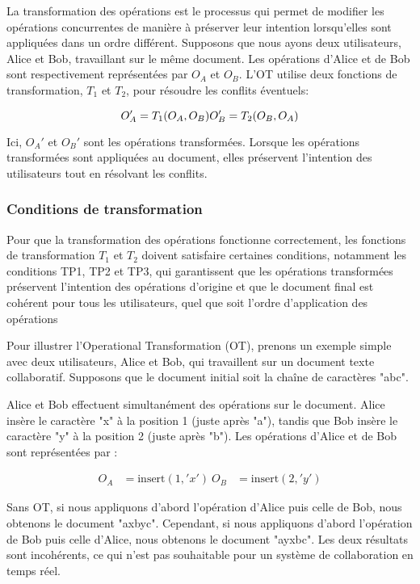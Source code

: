 La transformation des opérations est le processus qui permet de modifier les opérations concurrentes de manière à préserver leur intention lorsqu'elles sont appliquées dans un ordre différent. Supposons que nous ayons deux utilisateurs, Alice et Bob, travaillant sur le même document. Les opérations d'Alice et de Bob sont respectivement représentées par $O_A$ et $O_B$. L'OT utilise deux fonctions de transformation, $T_1$ et $T_2$, pour résoudre les conflits éventuels:

\begin{equation}
O_A' = T_1(O_A, O_B)\\
O_B' = T_2(O_B, O_A)
\end{equation}

Ici, $O_A'$ et $O_B'$ sont les opérations transformées. Lorsque les opérations transformées sont appliquées au document, elles préservent l'intention des utilisateurs tout en résolvant les conflits.

\subsubsection{Conditions de transformation}

Pour que la transformation des opérations fonctionne correctement, les fonctions de transformation $T_1$ et $T_2$ doivent satisfaire certaines conditions, notamment les conditions TP1, TP2 et TP3, qui garantissent que les opérations transformées préservent l'intention des opérations d'origine et que le document final est cohérent pour tous les utilisateurs, quel que soit l'ordre d'application des opérations

Pour illustrer l'Operational Transformation (OT), prenons un exemple simple avec deux utilisateurs, Alice et Bob, qui travaillent sur un document texte collaboratif. Supposons que le document initial soit la chaîne de caractères "abc".

Alice et Bob effectuent simultanément des opérations sur le document. Alice insère le caractère "x" à la position 1 (juste après "a"), tandis que Bob insère le caractère "y" à la position 2 (juste après "b"). Les opérations d'Alice et de Bob sont représentées par :

\begin{equation}
\begin{aligned}
O_A &= \text{insert}(1, 'x') \
O_B &= \text{insert}(2, 'y')
\end{aligned}
\end{equation}

Sans OT, si nous appliquons d'abord l'opération d'Alice puis celle de Bob, nous obtenons le document "axbyc". Cependant, si nous appliquons d'abord l'opération de Bob puis celle d'Alice, nous obtenons le document "ayxbc". Les deux résultats sont incohérents, ce qui n'est pas souhaitable pour un système de collaboration en temps réel.

